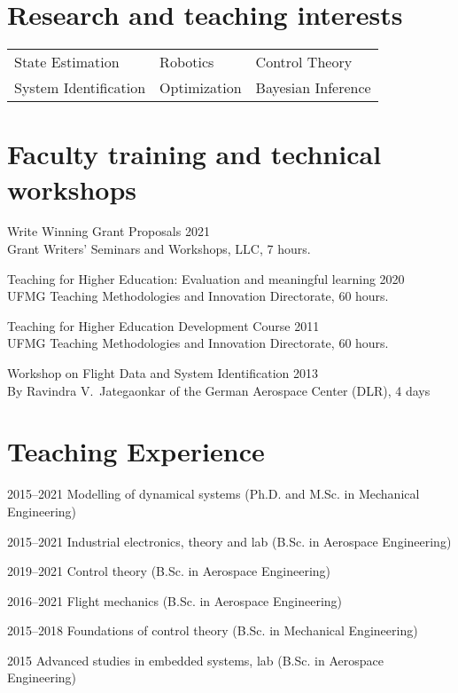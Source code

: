 \documentclass[a4paper, 11pt, oneside]{memoir}
\begin{document}
\section{Research and teaching interests}
\begin{tabular}{lll}
  State Estimation & Robotics & Control Theory
  \\
  System Identification & Optimization & Bayesian Inference
\end{tabular}

\section{Faculty training and technical workshops}
\begin{description}
\item Write Winning Grant Proposals \hfill 2021
  \\
  Grant Writers' Seminars and Workshops, LLC, 7 hours.
\item Teaching for Higher Education: Evaluation and meaningful learning
  \hfill 2020
  \\
  UFMG Teaching Methodologies and Innovation Directorate, 60 hours.
\item Teaching for Higher Education Development Course \hfill 2011
  \\
  UFMG Teaching Methodologies and Innovation Directorate, 60 hours.
\item Workshop on Flight Data and System Identification \hfill 2013
  \\
  By Ravindra V.~Jategaonkar of the German Aerospace Center (DLR), 4 days
\end{description}

\clearpage

\section{Teaching Experience}
\begin{description}
\item {2015--2021}
{Modelling of dynamical systems (Ph.D. and M.Sc. in Mechanical Engineering)}
\item {2015--2021}
{Industrial electronics, theory and lab (B.Sc. in Aerospace Engineering)}
\item {2019--2021} {Control theory (B.Sc. in Aerospace Engineering)}
\item {2016--2021} {Flight mechanics (B.Sc. in Aerospace Engineering)}
\item {2015--2018} {Foundations of control theory (B.Sc. in Mechanical Engineering)}
\item {2015}
{Advanced studies in embedded systems, lab (B.Sc. in Aerospace Engineering)}
\end{description}
\end{document}
